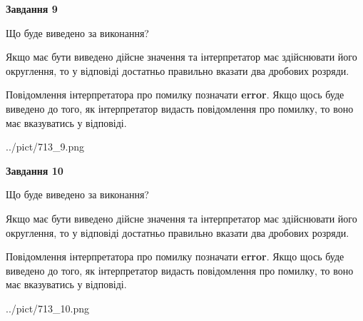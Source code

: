\documentclass[12pt, ukrainian]{article}
\begin{document}
{\begin {Large}
{\begin {center}\textbf{Завдання 9}\end {center}}\par
Що буде виведено за виконання? \par

Якщо має бути виведено дійсне значення та інтерпретатор має здійснювати його округлення, 
то у відповіді достатньо правильно вказати два дробових розряди.

Повідомлення інтерпретатора про помилку позначати \textbf{error}.
Якщо щось буде виведено до того, як інтерпретатор видасть повідомлення про помилку, 
то воно має вказуватись у відповіді. \par

\begin{center}
	{../pict/713_9.png}
\end{center}
\newpage

{\begin {center}\textbf{Завдання 10}\end {center}}\par
Що буде виведено за виконання? \par

Якщо має бути виведено дійсне значення та інтерпретатор має здійснювати його округлення, 
то у відповіді достатньо правильно вказати два дробових розряди.

Повідомлення інтерпретатора про помилку позначати \textbf{error}.
Якщо щось буде виведено до того, як інтерпретатор видасть повідомлення про помилку, 
то воно має вказуватись у відповіді. \par

\begin{center}
	{../pict/713_10.png}
\end{center}
\newpage

\end {Large}}
\end{document}

